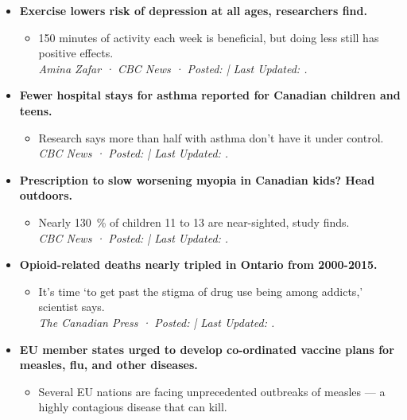 \begin{itemize}
    \item \textbf{Exercise lowers risk of depression at all ages, researchers find.}
          \begin{itemize}
              \item 150 minutes of activity each week is beneficial, but doing less still has positive effects.\\
                    \emph{Amina Zafar · CBC News · Posted:   | Last Updated: .}%
          \end{itemize}
    \item \textbf{Fewer hospital stays for asthma reported for Canadian children and teens.}
          \begin{itemize}
              \item Research says more than half with asthma don't have it under control.\\
                    \emph{CBC News · Posted:  | Last Updated: .}%
          \end{itemize}
    \item \textbf{Prescription to slow worsening myopia in Canadian kids? Head outdoors.}
          \begin{itemize}
              \item Nearly \qty{130}{\percent} of children 11 to 13 are near-sighted, study finds.\\
                    \emph{CBC News · Posted:  | Last Updated: .}%
          \end{itemize}
    \item \textbf{Opioid-related deaths nearly tripled in Ontario from 2000-2015.}%
          \begin{itemize}
              \item It's time `to get past the stigma of drug use being among addicts,' scientist says.\\
                    \emph{The Canadian Press · Posted:  | Last Updated: .}%
          \end{itemize}
    \item \textbf{EU member states urged to develop co-ordinated vaccine plans for measles, flu, and other diseases.}
          \begin{itemize}
              \item Several EU nations are facing unprecedented outbreaks of measles --- a highly contagious disease that can kill.\\

\end{itemize}
\end{itemize}
